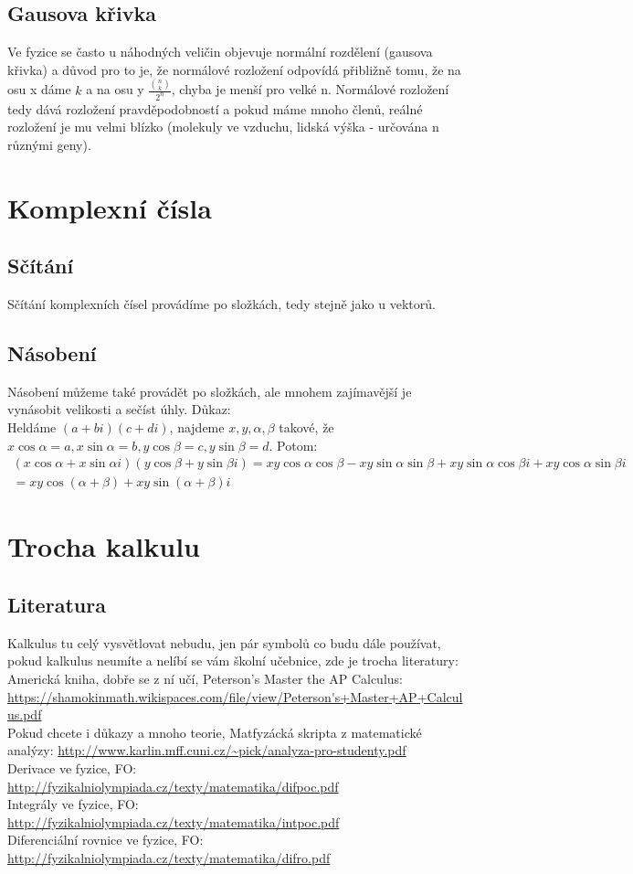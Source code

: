 \documentclass[titlepage]{book}
\begin{document}
\subsection{Gausova křivka}
Ve fyzice se často u náhodných veličin objevuje normální rozdělení (gausova křivka) a důvod pro to je, že normálové rozložení odpovídá přibližně tomu, že na osu x dáme $k$ a na osu y $\frac{\binom{n}{k}}{2^n}$, chyba je menší pro velké n. Normálové rozložení tedy dává rozložení pravděpodobností a pokud máme mnoho členů, reálné rozložení je mu velmi blízko (molekuly ve vzduchu, lidská výška - určována n různými geny).
\section{Komplexní čísla}
\subsection{Sčítání}
Sčítání komplexních čísel provádíme po složkách, tedy stejně jako u vektorů.
\subsection{Násobení}
Násobení můžeme také provádět po složkách, ale mnohem zajímavější je vynásobit velikosti a sečíst úhly. Důkaz:\\
Heldáme $(a + bi)(c + di)$, najdeme $x,y,\alpha, \beta$ takové, že $x \cos\alpha = a, x \sin\alpha = b, y \cos\beta = c, y \sin\beta = d$. Potom:
\begin{multline}
(x \cos\alpha + x \sin\alpha i)(y \cos\beta + y \sin\beta i) = xy\cos\alpha\cos\beta - xy\sin\alpha\sin\beta + xy\sin\alpha\cos\beta i + xy\cos\alpha\sin\beta i \\
= xy\cos(\alpha + \beta) + xy\sin(\alpha + \beta) i
\end{multline}
\section{Trocha kalkulu}
\subsection{Literatura}
Kalkulus tu celý vysvětlovat nebudu, jen pár symbolů co budu dále používat, pokud kalkulus neumíte a nelíbí se vám školní učebnice, zde je trocha literatury:\\
Americká kniha, dobře se z ní učí, Peterson's Master the AP Calculus: \url{https://shamokinmath.wikispaces.com/file/view/Peterson's+Master+AP+Calculus.pdf}\\
Pokud chcete i důkazy a mnoho teorie, Matfyzácká skripta z matematické analýzy: \url{http://www.karlin.mff.cuni.cz/~pick/analyza-pro-studenty.pdf}\\
Derivace ve fyzice, FO: \url{http://fyzikalniolympiada.cz/texty/matematika/difpoc.pdf}\\
Integrály ve fyzice, FO: \url{http://fyzikalniolympiada.cz/texty/matematika/intpoc.pdf}\\
Diferenciální rovnice ve fyzice, FO: \url{http://fyzikalniolympiada.cz/texty/matematika/difro.pdf}
\end{document}
